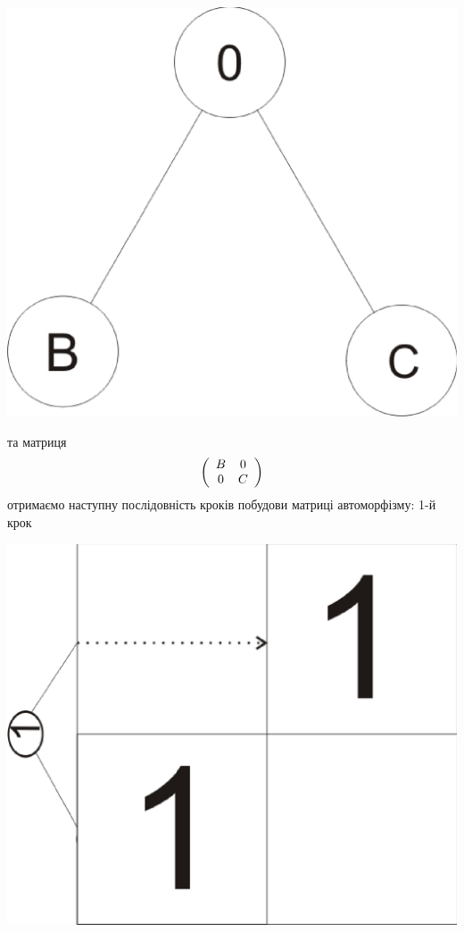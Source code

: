 \documentclass[a4paper,12pt]{article} \usepackage{a4wide}
\numberwithin{equation}{subsection}
\begin{document}
\begin{center}
\includegraphics[scale=0.3]{port0ab.eps}
\end{center}
та матриця
\[
\left( {\begin{array}{*{20}c}
   B & 0  \\
   0 & C  \\
\end{array}} \right)
\]
отримаємо наступну послідовність кроків побудови матриці автоморфізму:
1-й крок
\begin{center}
\includegraphics[scale=0.4]{Autfm4.eps}
\end{center}
\end{document}
